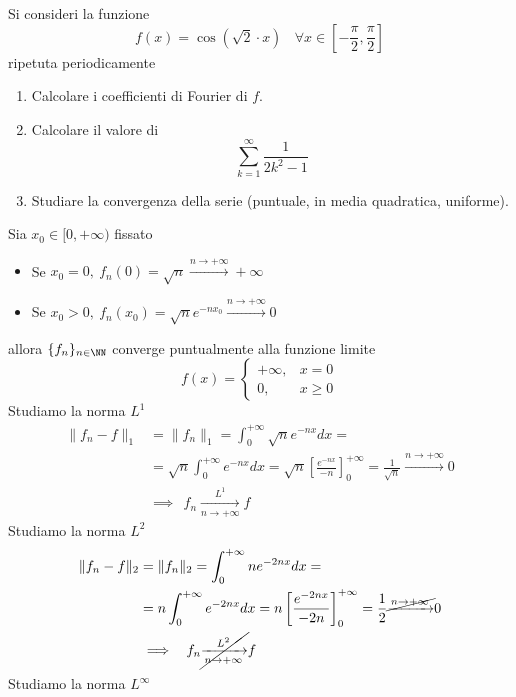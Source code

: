 \Esercizio{}

Si consideri la funzione
\begin{equation*}
f(x) = \cos\left(\sqrt{2} \cdot x\right) \ \ \ \ \forall x\in \left[ - \frac{\pi}{2}, \frac{\pi}{2}\right]
\end{equation*}
ripetuta periodicamente
\begin{enumerate}
\item Calcolare i coefficienti di Fourier di $f$.
\item Calcolare il valore di
\begin{equation*}
\sum\limits^{\infty}_{k = 1}\frac{1}{2k^{2} - 1}
\end{equation*}
\item Studiare la convergenza della serie (puntuale, in media quadratica, uniforme).
\end{enumerate}

\ParteSoluzioni

\Soluzione

Sia $x_{0} \in [ 0, + \infty)$ fissato
\begin{itemize}
\item Se $x_{0} = 0, \ f_{n}(0) = \sqrt{n}\xrightarrow{n\rightarrow + \infty} + \infty $
\item Se $x_{0} > 0, \ f_{n}(x_{0}) = \sqrt{n} e^{- nx_{0}}\xrightarrow{n\rightarrow + \infty} 0$
\end{itemize}
allora $\{f_{n}\}_{n\in \NN}$ converge puntualmente alla funzione limite
\begin{equation*}
f(x) =
\begin{cases}
+ \infty, & x = 0\\
0, & x \geq 0
\end{cases}
\end{equation*}
Studiamo la norma $L^{1}$
\begin{equation*}
\begin{aligned}
\| f_{n} - f\|_{1} & = \| f_{n} \|_{1} = \int^{+ \infty}_{0}\sqrt{n} e^{- nx} dx = \\
 & = \sqrt{n}\int^{+ \infty}_{0} e^{- nx} dx = \sqrt{n}\left[\frac{e^{- nx}}{- n}\right]^{+ \infty}_{0} = \frac{1}{\sqrt{n}}\xrightarrow{n\rightarrow + \infty} 0\\
 & \implies \ \ f_{n}\xrightarrow[n\rightarrow + \infty ]{L^{1}} f
\end{aligned}
\end{equation*}
Studiamo la norma $L^{2}$
\begin{equation*}
\begin{aligned}
\| f_{n} - f\|_{2} & = \| f_{n} \|_{2} = \int^{+ \infty}_{0} ne^{- 2nx} dx = \\
 & = n\int^{+ \infty}_{0} e^{- 2nx} dx = n\left[\frac{e^{- 2nx}}{- 2n}\right]^{+ \infty}_{0} = \frac{1}{2}\cancel{\xrightarrow{n\rightarrow + \infty}} 0\\
 & \implies \ \ f_{n}\cancel{\xrightarrow[n\rightarrow + \infty ]{L^{2}}} f
\end{aligned}
\end{equation*}
Studiamo la norma $L^{\infty}$

